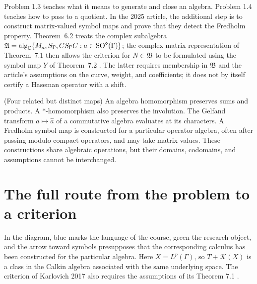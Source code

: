 Problem 1.3 teaches what it means to generate and close an algebra.
Problem 1.4 teaches how to pass to a quotient. In the 2025 article,
the additional step is to construct matrix-valued symbol maps and
prove that they detect the Fredholm property. Theorem~6.2 treats the
complex subalgebra
$\mathfrak A=\operatorname{alg}_{\mathbb C}
\{M_a,S_\Gamma,CS_\Gamma C:a\in\operatorname{SO}^\diamond(\Gamma)\}$;
the complex matrix representation of Theorem~7.1 then allows the
criterion for $N\in\mathfrak B$ to be formulated using the symbol map
$Y$ of Theorem~7.2 \cite[pp.~25--26]{Karlovich2025}. The latter
requires membership in $\mathfrak B$ and the article's assumptions
on the curve, weight, and coefficients; it does not by itself certify
a Haseman operator with a shift.

\begin{cthnota}{(Four related but distinct maps)}
An algebra homomorphism preserves sums and products. A
$*$-homomorphism also preserves the involution. The Gelfand transform
$a\mapsto\widehat a$ of a commutative algebra evaluates at its
characters. A Fredholm symbol map is constructed for a particular
operator algebra, often after passing modulo compact operators, and
may take matrix values. These constructions share algebraic
operations, but their domains, codomains, and assumptions cannot be
interchanged.
\end{cthnota}

\section{The full route from the problem to a criterion}

In the diagram, blue marks the language of the course, green the
research object, and the arrow toward symbols presupposes that the
corresponding calculus has been constructed for the particular
algebra. Here $X=L^p(\Gamma)$, so $T+\mathcal K(X)$ is a class in the
Calkin algebra associated with the same underlying space. The
criterion of Karlovich 2017 also requires the assumptions of its
Theorem 7.1 \cite[pp.~487--489]{Karlovich2017}.

